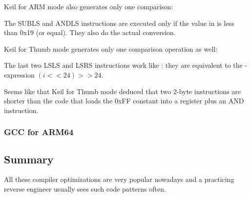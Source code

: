 \Optimizing Keil for ARM mode also generates only one comparison:



The SUBLS and ANDLS instructions are executed only if the value in  is less than 0x19 (or equal).
They also do the actual conversion.

\Optimizing Keil for Thumb mode generates only one comparison operation as well:



The last two LSLS and LSRS instructions work like :
they are equivalent to the \CCpp-expression $(i<<24)>>24$.

Seems like that Keil for Thumb mode deduced that two 2-byte instructions are shorter than the code 
that loads the 0xFF constant into a register plus an AND instruction.

\subsubsection{GCC for ARM64}





\subsection{Summary}

All these compiler optimizations are very popular nowadays 
and a practicing reverse engineer usually sees such code patterns often.

